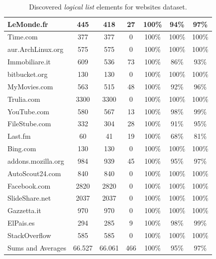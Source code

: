 \begin{table}
\begin{tabular}{|l|c|c|c|c|c|c|}
  \hline
  LeMonde.fr & 445 & 418 & 27 & 100\% & 94\% & 97\% \\
  \hline
  Time.com & 377 & 377 & 0 & 100\% & 100\% & 100\% \\
  \hline
  aur.ArchLinux.org & 575 & 575 & 0 & 100\% & 100\% & 100\% \\
  \hline
  Immobiliare.it & 609 & 536 & 73 & 100\% & 86\% & 93\% \\
  \hline
  bitbucket.org & 130 & 130 & 0 & 100\% & 100\% & 100\% \\
  \hline
  MyMovies.com & 563 & 515 & 48 & 100\% & 92\% & 96\% \\
  \hline
  Trulia.com & 3300 & 3300 & 0 & 100\% & 100\% & 100\% \\
  \hline
  YouTube.com & 580 & 567 & 13 & 100\% & 98\% & 99\% \\
  \hline
  FileStube.com & 332 & 304 & 28 & 100\% & 91\% & 95\% \\
  \hline
  Last.fm & 60 & 41 & 19 & 100\% & 68\% & 81\% \\
  \hline
  Bing.com & 130 & 130 & 0 & 100\% & 100\% & 100\% \\
  \hline
  addons.mozilla.org & 984 & 939 & 45 & 100\% & 95\% & 97\% \\
  \hline
  AutoScout24.com & 840 & 840 & 0 & 100\% & 100\% & 100\% \\
  \hline
  Facebook.com & 2820 & 2820 & 0 & 100\% & 100\% & 100\% \\
  \hline
  SlideShare.net & 2037 & 2037 & 0 & 100\% & 100\% & 100\% \\
  \hline
  Gazzetta.it & 970 & 970 & 0 & 100\% & 100\% & 100\% \\
  \hline
  ElPais.es & 294 & 285 & 9 & 100\% & 98\% & 99\% \\
  \hline
  StackOverflow & 585 & 585 & 0 & 100\% & 100\% & 100\% \\
  \hline
  \hline
  Sums and  Averages & 66.527 & 66.061 & 466 & 100\% & 95\% & 97\% \\
  \hline
  \end{tabular}
 \label{table:results}
 \caption{Discovered \emph{logical list} elements for websites dataset.}
\end{table}
